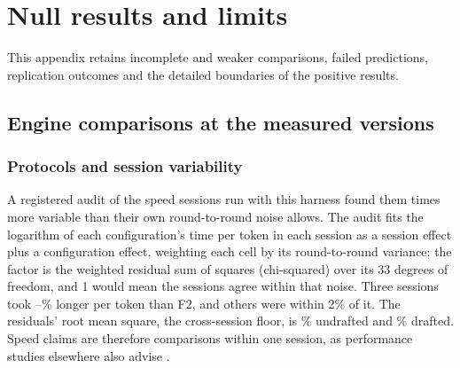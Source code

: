 \documentclass[11pt,letterpaper]{article}
\begin{document}





\appendix
\section{Null results and limits}
\label{app:null}
This appendix retains incomplete and weaker comparisons, failed predictions,
replication outcomes and the detailed boundaries of the positive results.

\subsection{Engine comparisons at the measured versions}
\label{app:engine-comparisons}
\subsubsection{Protocols and session variability}
A registered audit of the \PeAuditSessions{} speed sessions
run with this harness found them \PeAuditChi{} times more variable than their
own round-to-round noise allows. The audit fits the logarithm of each
configuration's time per token in each session as a session effect plus a
configuration effect, weighting each cell by its round-to-round variance; the
factor is the weighted residual sum of squares (chi-squared) over its 33 degrees
of freedom, and 1 would mean the sessions agree within that noise. Three
sessions took \PeAuditSlowLo--\PeAuditSlowHi\% longer per token than F2, and
\PeAuditCloseWord{} others were within 2\% of it. The residuals' root mean square,
the cross-session floor, is \PeAuditFloorUndrafted\% undrafted and
\PeAuditFloorDrafted\% drafted. Speed claims are therefore comparisons
within one session, as performance studies elsewhere also advise
\citep{mytkowicz2009producing,hoefler2015scientific}.
\end{document}
